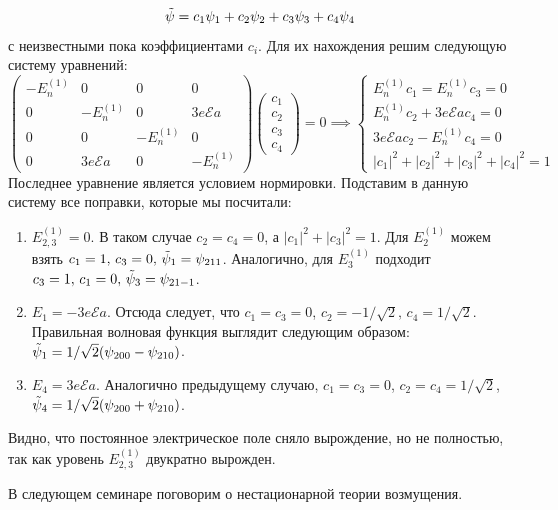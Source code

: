\[
  \Tilde{\psi} = c_1\psi_1+c_2\psi_2+c_3\psi_3+c_4\psi_4
\]
с неизвестными пока коэффициентами $c_i$. Для их нахождения решим следующую
систему уравнений:
\[
  \begin{pmatrix}
    -E_n^{(1)} & 0 & 0 & 0 \\ 0 & -E_n^{(1)} & 0 & 3e\mathcal{E}a \\  0 & 0 & -E_n^{(1)} & 0 \\ 0 & 3e\mathcal{E}a & 0 & -E_n^{(1)}
  \end{pmatrix}
  \begin{pmatrix}
    c_1 \\ c_2 \\ c_3 \\ c_4
  \end{pmatrix}=0 \implies\begin{cases}
    E_n^{(1)}c_1 = E_n^{(1)}c_3 = 0 \\
    E_n^{(1)} c_2 + 3e\mathcal{E} a c_4=0 \\
    3e\mathcal{E}a c_2 - E_n^{(1)} c_4 =0 \\
    |c_1|^2+|c_2|^2+|c_3|^2+|c_4|^2=1
  \end{cases}
\]
Последнее уравнение является условием нормировки. Подставим в данную систему
все поправки, которые мы посчитали:
\begin{enumerate}
  \item $E^{(1)}_{2,3}=0$. В таком случае $c_2=c_4=0$, а $|c_1|^2+|c_3|^2=1$. Для
        $E^{(1)}_2$ можем взять $c_1=1, \, c_3 = 0, \, \Tilde{\psi}_1 = \psi_{211}$.
        Аналогично, для $E^{(1)}_3$ подходит $c_3=1, \, c_1=0, \,
          \Tilde{\psi}_3=\psi_{21-1}$.
  \item $E_1=-3e\mathcal{E}a$. Отсюда следует, что $c_1=c_3=0$, $c_2=-1/\sqrt{2},\, c_4
          = 1/\sqrt{2}$. Правильная волновая функция выглядит следующим образом:
        $\Tilde{\psi}_1 = 1/\sqrt{2}(\psi_{200}-\psi_{210})$.
  \item $E_4=3e\mathcal{E}a$. Аналогично предыдущему случаю, $c_1=c_3=0$,
        $c_2=c_4=1/\sqrt{2}$, $\Tilde{\psi}_4 = 1/\sqrt{2}(\psi_{200}+\psi_{210})$.
\end{enumerate}
Видно, что постоянное электрическое поле сняло вырождение, но не полностью, так
как уровень $E_{2,3}^{(1)}$ двукратно вырожден.
\qedsq

В следующем семинаре поговорим о нестационарной теории возмущения.